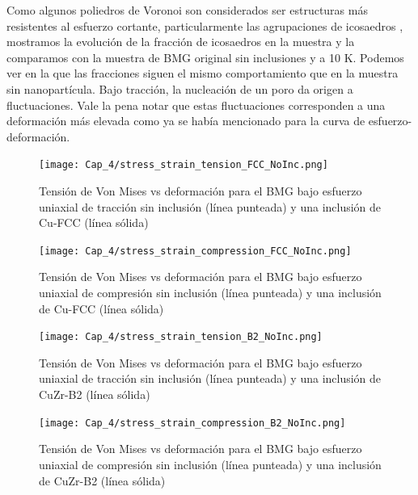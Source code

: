 Como algunos poliedros de Voronoi son considerados ser estructuras más resistentes al esfuerzo cortante, particularmente las agrupaciones de icosaedros \citep{cheng08}, mostramos la evolución de la fracción de icosaedros en la muestra y la comparamos con la muestra de BMG original sin inclusiones y a 10 K. Podemos ver en la  que las fracciones siguen el mismo comportamiento que en la muestra sin nanopartícula. Bajo tracción, la nucleación de un poro da origen a fluctuaciones. Vale la pena notar que estas fluctuaciones corresponden a una deformación más elevada como ya se había mencionado para la curva de esfuerzo-deformación.

\begin{figure}[htp]
\centering
\texttt{[image: Cap\_4/stress\_strain\_tension\_FCC\_NoInc.png]}
\caption[Von Mises vs deformación en tracción. Inclusión Cu-FCC]{Tensión de Von Mises vs deformación para el BMG bajo esfuerzo uniaxial de tracción sin inclusión (línea punteada) y una inclusión de Cu-FCC (línea sólida)}
\label{C4:fg:fcc_vm_tension}
\end{figure}

\begin{figure}[htp]
\centering
\texttt{[image: Cap\_4/stress\_strain\_compression\_FCC\_NoInc.png]}
\caption[Von Mises vs deformación en compresión. Inclusión de Cu-FCC]{Tensión de Von Mises vs deformación para el BMG bajo esfuerzo uniaxial de compresión sin inclusión (línea punteada) y una inclusión de Cu-FCC (línea sólida)}
\label{C4:fg:fcc_vm_compression}
\end{figure}

\begin{figure}[htp]
\centering
\texttt{[image: Cap\_4/stress\_strain\_tension\_B2\_NoInc.png]}
\caption[Von Mises vs deformación en tracción. Inclusión de CuZr-B2]{Tensión de Von Mises vs deformación para el BMG bajo esfuerzo uniaxial de tracción sin inclusión (línea punteada) y una inclusión de CuZr-B2 (línea sólida)}
\label{C4:fg:b2_vm_tension}
\end{figure}

\begin{figure}[htp]
\centering
\texttt{[image: Cap\_4/stress\_strain\_compression\_B2\_NoInc.png]}
\caption[Von Mises vs deformación en compresión. Inclusión de CuZr-B2]{Tensión de Von Mises vs deformación para el BMG bajo esfuerzo uniaxial de compresión sin inclusión (línea punteada) y una inclusión de CuZr-B2 (línea sólida)}
\label{C4:fg:b2_vm_compression}
\end{figure}

